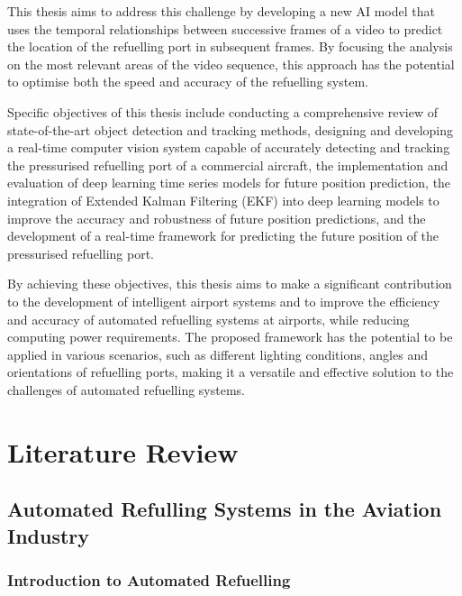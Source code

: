 \documentclass[12pt,oneside]{book} %
\begin{document}
This thesis aims to address this challenge by developing a new AI model that
uses the temporal relationships between successive frames of a video to predict
the location of the refuelling port in subsequent frames. By focusing the
analysis on the most relevant areas of the video sequence, this approach has
the potential to optimise both the speed and accuracy of the refuelling system.

Specific objectives of this thesis include conducting a comprehensive review of
state-of-the-art object detection and tracking methods, designing and
developing a real-time computer vision system capable of accurately detecting
and tracking the pressurised refuelling port of a commercial aircraft, the
implementation and evaluation of deep learning time series models for future
position prediction, the integration of Extended Kalman Filtering (EKF) into
deep learning models to improve the accuracy and robustness of future position
predictions, and the development of a real-time framework for predicting the
future position of the pressurised refuelling port.

By achieving these objectives, this thesis aims to make a significant
contribution to the development of intelligent airport systems and to improve
the efficiency and accuracy of automated refuelling systems at airports, while
reducing computing power requirements. The proposed framework has the potential
to be applied in various scenarios, such as different lighting conditions,
angles and orientations of refuelling ports, making it a versatile and
effective solution to the challenges of automated refuelling systems.

\chapter{Literature Review}
\section{Automated Refulling Systems in the Aviation Industry}
\subsection{Introduction to Automated Refuelling}
\end{document}
